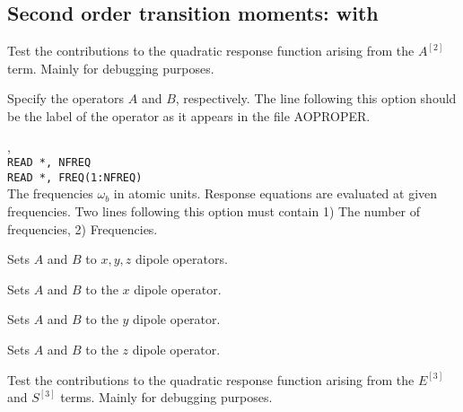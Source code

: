 \subsection{Second order transition moments:  with }


\begin{description}

\item{}
Test the contributions to the quadratic response function arising from
the $A^{\left[2\right]}$ term. Mainly for debugging purposes.

\item[\Key{APROP}, \Key{BPROP}]
Specify the operators $A$ and $B$, respectively. The line following this
option should be the label of the operator as it appears in the file
AOPROPER.

\item{, }\\
\verb|READ *, NFREQ|\\
\verb|READ *, FREQ(1:NFREQ)|\\
The frequencies $\omega_b$ in atomic units.
Response equations are evaluated at given
frequencies. Two lines
following this option must contain 1) The number of frequencies, 2)
Frequencies.

\item{}
Sets $A$ and $B$ to $x, y, z$ dipole operators.

\item{}
Sets $A$ and $B$ to the $x$ dipole operator.

\item{}
Sets $A$ and $B$ to the $y$ dipole operator.

\item{}
Sets $A$ and $B$ to the $z$ dipole operator.

\item{}
Test the contributions to the quadratic response function arising from
the $E^{\left[3\right]}$ and $S^{\left[3\right]}$ terms.  Mainly for
debugging purposes.


\end{description}
